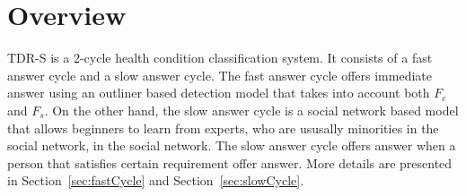 \section{Overview}
TDR-S is a 2-cycle health condition classification system. 
It consists of a fast answer cycle and a slow answer cycle. 
The fast answer cycle offers immediate answer using an outliner based detection model that takes into account both $F_c$ 
and $F_s$. 
On the other hand, the slow answer cycle is a social network based model that allows beginners to learn from experts, 
who are ususally minorities in the social network, in the social network. 
The slow answer cycle offers answer when a person that satisfies certain requirement offer answer. 
More details are presented in Section~\ref{sec:fastCycle} and Section~\ref{sec:slowCycle}. 





